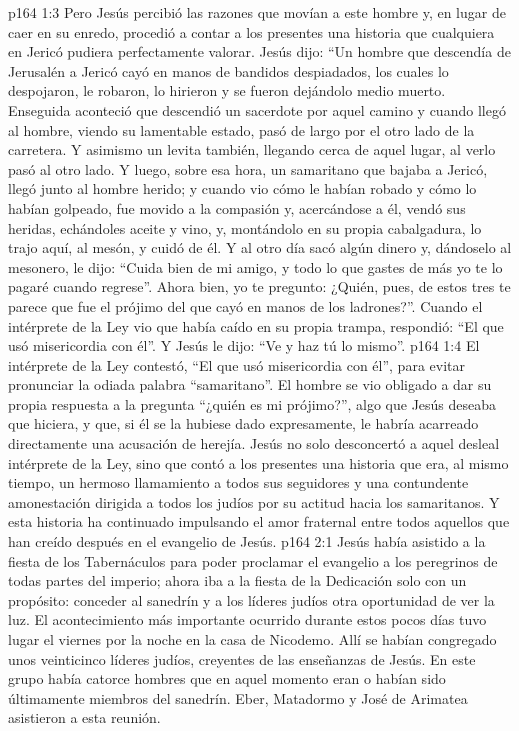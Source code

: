 \vs p164 1:3 Pero Jesús percibió las razones que movían a este hombre y, en lugar de caer en su enredo, procedió a contar a los presentes una historia que cualquiera en Jericó pudiera perfectamente valorar. Jesús dijo: “Un hombre que descendía de Jerusalén a Jericó cayó en manos de bandidos despiadados, los cuales lo despojaron, le robaron, lo hirieron y se fueron dejándolo medio muerto. Enseguida aconteció que descendió un sacerdote por aquel camino y cuando llegó al hombre, viendo su lamentable estado, pasó de largo por el otro lado de la carretera. Y asimismo un levita también, llegando cerca de aquel lugar, al verlo pasó al otro lado. Y luego, sobre esa hora, un samaritano que bajaba a Jericó, llegó junto al hombre herido; y cuando vio cómo le habían robado y cómo lo habían golpeado, fue movido a la compasión y, acercándose a él, vendó sus heridas, echándoles aceite y vino, y, montándolo en su propia cabalgadura, lo trajo aquí, al mesón, y cuidó de él. Y al otro día sacó algún dinero y, dándoselo al mesonero, le dijo: “Cuida bien de mi amigo, y todo lo que gastes de más yo te lo pagaré cuando regrese”. Ahora bien, yo te pregunto: ¿Quién, pues, de estos tres te parece que fue el prójimo del que cayó en manos de los ladrones?”. Cuando el intérprete de la Ley vio que había caído en su propia trampa, respondió: “El que usó misericordia con él”. Y Jesús le dijo: “Ve y haz tú lo mismo”.
\vs p164 1:4 El intérprete de la Ley contestó, “El que usó misericordia con él”, para evitar pronunciar la odiada palabra “samaritano”. El hombre se vio obligado a dar su propia respuesta a la pregunta “¿quién es mi prójimo?”, algo que Jesús deseaba que hiciera, y que, si él se la hubiese dado expresamente, le habría acarreado directamente una acusación de herejía. Jesús no solo desconcertó a aquel desleal intérprete de la Ley, sino que contó a los presentes una historia que era, al mismo tiempo, un hermoso llamamiento a todos sus seguidores y una contundente amonestación dirigida a todos los judíos por su actitud hacia los samaritanos. Y esta historia ha continuado impulsando el amor fraternal entre todos aquellos que han creído después en el evangelio de Jesús.
\vs p164 2:1 Jesús había asistido a la fiesta de los Tabernáculos para poder proclamar el evangelio a los peregrinos de todas partes del imperio; ahora iba a la fiesta de la Dedicación solo con un propósito: conceder al sanedrín y a los líderes judíos otra oportunidad de ver la luz. El acontecimiento más importante ocurrido durante estos pocos días tuvo lugar el viernes por la noche en la casa de Nicodemo. Allí se habían congregado unos veinticinco líderes judíos, creyentes de las enseñanzas de Jesús. En este grupo había catorce hombres que en aquel momento eran o habían sido últimamente miembros del sanedrín. Eber, Matadormo y José de Arimatea asistieron a esta reunión.
